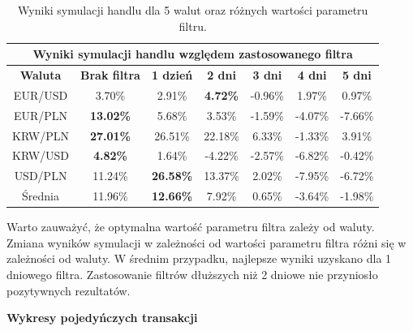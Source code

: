 \documentclass[12pt, a4paper]{article}
\begin{document}
\begin{center}
    \begin{table}[ht]
        \centering
        \begin{tabular}{|c||c|c|c|c|c|c|}
            \hline
            \multicolumn{7}{|c|}{\textbf{Wyniki symulacji handlu względem zastosowanego filtra}}                                           \\
            \hline
            \textbf{Waluta} & \textbf{Brak filtra} & \textbf{1 dzień} & \textbf{2 dni}  & \textbf{3 dni} & \textbf{4 dni} & \textbf{5 dni} \\
            \hline
            EUR/USD         & 3.70\%               & 2.91\%           & \textbf{4.72\%} & -0.96\%        & 1.97\%         & 0.97\%         \\
            \hline
            EUR/PLN         & \textbf{13.02\%}     & 5.68\%           & 3.53\%          & -1.59\%        & -4.07\%        & -7.66\%        \\
            \hline
            KRW/PLN         & \textbf{27.01\%}     & 26.51\%          & 22.18\%         & 6.33\%         & -1.33\%        & 3.91\%         \\
            \hline
            KRW/USD         & \textbf{4.82\%}      & 1.64\%           & -4.22\%         & -2.57\%        & -6.82\%        & -0.42\%        \\
            \hline
            USD/PLN         & 11.24\%              & \textbf{26.58\%} & 13.37\%         & 2.02\%         & -7.95\%        & -6.72\%        \\
            \hline
            \hline
            Średnia         & 11.96\%              & \textbf{12.66\%} & 7.92\%          & 0.65\%         & -3.64\%        & -1.98\%        \\
            \hline
        \end{tabular}
        \caption{Wyniki symulacji handlu dla 5 walut oraz różnych wartości parametru filtru.}
        \label{tab:results}
    \end{table}
\end{center}

Warto zauważyć, że optymalna wartość parametru filtra zależy od waluty.
Zmiana wyników symulacji w zależności od wartości parametru filtra
różni się w zależności od waluty. W średnim przypadku, najlepsze wyniki uzyskano dla 1 dniowego filtra.
Zastosowanie filtrów dłuższych niż 2 dniowe nie przyniosło pozytywnych rezultatów.

\bigskip
\textbf{Wykresy pojedyńczych transakcji}
\end{document}
